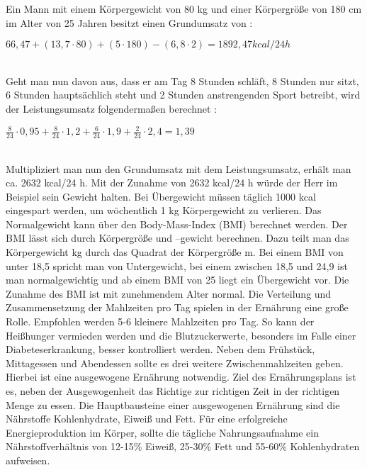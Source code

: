 	\setlength{\parindent}{0pt}Ein Mann mit einem Körpergewicht von 80 kg und einer Körpergröße von 180 cm im Alter von 25 Jahren besitzt einen Grundumsatz von \cite{SG}:\newline
	\\
		\centerline{$66,47 + (13,7 \cdot 80) + (5 \cdot 180) - (6,8 \cdot 2) {=} 1892,47 kcal/24 h $}\newline
	\\
	Geht man nun davon aus, dass er am Tag 8 Stunden schläft, 8 Stunden nur sitzt, 6 Stunden hauptsächlich steht und 2 Stunden anstrengenden Sport betreibt, wird der Leistungsumsatz folgendermaßen berechnet \cite{SG}:\newline
		\\
		\centerline{$\frac{8}{24} \cdot 0,95 + \frac {8}{24} \cdot 1,2 + \frac{6}{24} \cdot 1,9 + \frac {2}{24} \cdot 2,4 {=} 1,39$}\newline
		\\
	Multipliziert man nun den Grundumsatz mit dem Leistungsumsatz, erhält man ca. 2632 kcal/24 h. Mit der Zunahme von 2632 kcal/24 h würde der Herr im Beispiel sein Gewicht halten. Bei Übergewicht müssen täglich 1000 kcal eingespart werden, um wöchentlich 1 kg Körpergewicht zu verlieren.\newline
	Das Normalgewicht kann über den Body-Mass-Index (BMI) berechnet werden. Der BMI lässt sich durch Körpergröße und –gewicht berechnen. Dazu teilt man das Körpergewicht kg durch das Quadrat der Körpergröße m.\newline
	Bei einem BMI von unter 18,5 spricht man von Untergewicht, bei einem zwischen 18,5 und 24,9 ist man normalgewichtig und ab einem BMI von 25 liegt ein Übergewicht vor. Die Zunahme des BMI ist mit zunehmendem Alter normal.\newline
	Die Verteilung und Zusammensetzung der Mahlzeiten pro Tag spielen in der Ernährung eine große Rolle. Empfohlen werden 5-6 kleinere Mahlzeiten pro Tag. So kann der Heißhunger vermieden werden und die Blutzuckerwerte, besonders im Falle einer Diabeteserkrankung, besser kontrolliert werden. Neben dem Frühstück, Mittagessen und Abendessen sollte es drei weitere Zwischenmahlzeiten geben. Hierbei ist eine ausgewogene Ernährung notwendig. Ziel des Ernährungsplans ist es, neben der Ausgewogenheit das Richtige zur richtigen Zeit in der richtigen Menge zu essen. Die Hauptbausteine einer ausgewogenen Ernährung sind die Nährstoffe Kohlenhydrate, Eiweiß und Fett. Für eine erfolgreiche Energieproduktion im Körper, sollte die tägliche Nahrungsaufnahme ein Nährstoffverhältnis von 12-15\% Eiweiß, 25-30\% Fett und 55-60\% Kohlenhydraten aufweisen.\cite{SG} 
		
